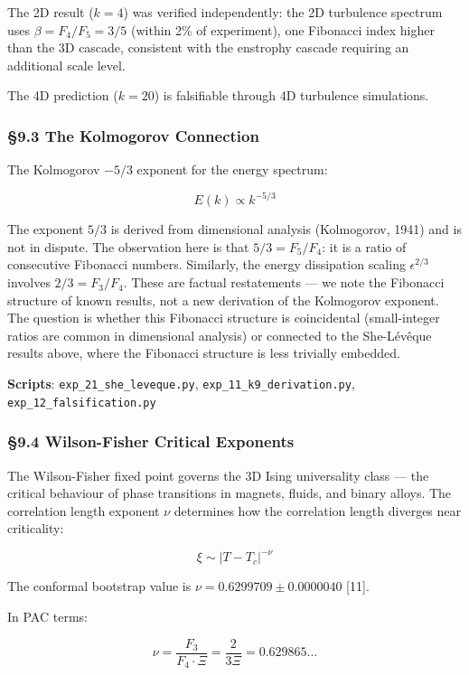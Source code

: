 \documentclass[
  11pt,
  a4paper]{article}
\begin{document}
The 2D result (\(k = 4\)) was verified independently: the 2D turbulence
spectrum uses \(\beta = F_4/F_5 = 3/5\) (within 2\% of experiment), one
Fibonacci index higher than the 3D cascade, consistent with the
enstrophy cascade requiring an additional scale level.

The 4D prediction (\(k = 20\)) is falsifiable through 4D turbulence
simulations.

\subsubsection{§9.3 The Kolmogorov
Connection}\label{the-kolmogorov-connection}

The Kolmogorov \(-5/3\) exponent for the energy spectrum:

\[E(k) \propto k^{-5/3}\]

The exponent \(5/3\) is derived from dimensional analysis (Kolmogorov,
1941) and is not in dispute. The observation here is that
\(5/3 = F_5/F_4\): it is a ratio of consecutive Fibonacci numbers.
Similarly, the energy dissipation scaling \(\epsilon^{2/3}\) involves
\(2/3 = F_3/F_4\). These are factual restatements --- we note the
Fibonacci structure of known results, not a new derivation of the
Kolmogorov exponent. The question is whether this Fibonacci structure is
coincidental (small-integer ratios are common in dimensional analysis)
or connected to the She-Lévêque results above, where the Fibonacci
structure is less trivially embedded.

\textbf{Scripts}: \texttt{exp\_21\_she\_leveque.py},
\texttt{exp\_11\_k9\_derivation.py}, \texttt{exp\_12\_falsification.py}

\subsubsection{§9.4 Wilson-Fisher Critical
Exponents}\label{wilson-fisher-critical-exponents}

The Wilson-Fisher fixed point governs the 3D Ising universality class
--- the critical behaviour of phase transitions in magnets, fluids, and
binary alloys. The correlation length exponent \(\nu\) determines how
the correlation length diverges near criticality:

\[\xi \sim |T - T_c|^{-\nu}\]

The conformal bootstrap value is \(\nu = 0.6299709 \pm 0.0000040\)
{[}11{]}.

In PAC terms:

\[\nu = \frac{F_3}{F_4 \cdot \Xi} = \frac{2}{3\Xi} = 0.629865\ldots\]
\end{document}
